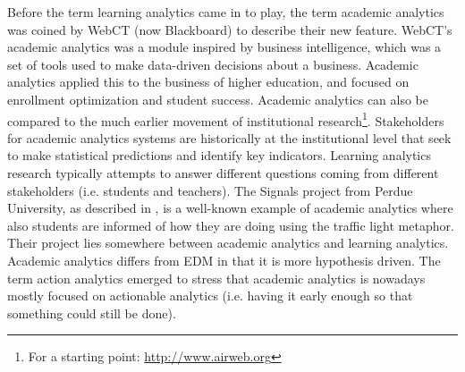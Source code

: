 \documentclass[11pt]{article}
\begin{document}
Before the term learning analytics came in to play, the term academic analytics was coined by WebCT (now Blackboard) to describe their new feature. WebCT's academic analytics was a module inspired by business intelligence, which was a set of tools used to make data-driven decisions about a business. Academic analytics applied this to the business of higher education, and focused on enrollment optimization and student success. Academic analytics can also be compared to the much earlier movement of institutional research\footnote{For a starting point: \url{http://www.airweb.org}}. Stakeholders for academic analytics systems are historically at the institutional level that seek to make statistical predictions and identify key indicators. Learning analytics research typically attempts to answer different questions coming from different stakeholders (i.e. students and teachers). The Signals project from Perdue University, as described in \cite{Arnold2010}, is a well-known example of academic analytics where also 
students are informed of how they are doing using the traffic light metaphor. Their project lies somewhere between academic analytics and learning analytics. Academic analytics differs from EDM in that it is more hypothesis driven. The term action analytics emerged to stress that academic analytics is nowadays mostly focused on actionable analytics (i.e. having it early enough so that something could still be done).
\end{document}
